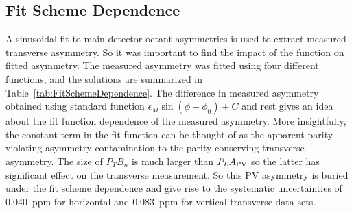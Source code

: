 \subsection{Fit Scheme Dependence}
\label{Fit Scheme Dependence}
A sinusoidal fit to main detector octant asymmetries is used to extract measured transverse asymmetry. So it was important to find the impact of the function on fitted asymmetry.
The measured asymmetry was fitted using four different functions, and the solutions are summarized in Table~\ref{tab:FitSchemeDependence}. 
The difference in measured asymmetry obtained using standard function $\epsilon_{M}\sin(\phi+\phi_{0})+C$ and rest gives an idea about the fit function dependence of the measured asymmetry. More insightfully, the constant term in the fit function can be thought of as the apparent parity violating asymmetry contamination to the parity conserving transverse asymmetry. The size of $P_{T}B_{n}$ is much larger than $P_{L}A_{\rm PV}$ so the latter has significant effect on the transverse measurement. So this PV asymmetry is buried under the fit scheme dependence and give rise to the systematic uncertainties of 0.040~ppm for horizontal and 0.083~ppm for vertical transverse data sets. 

